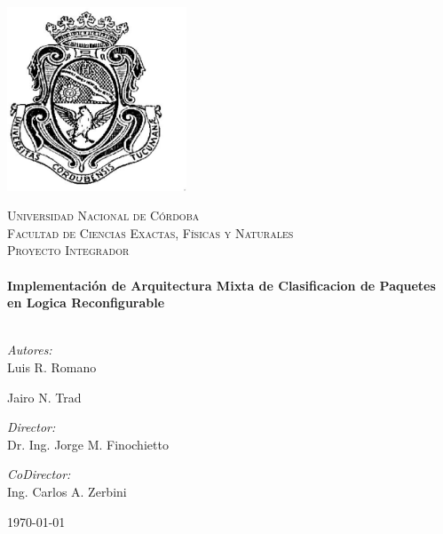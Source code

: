 
\begin{titlepage}
\begin{center}
\includegraphics[width=0.4\textwidth]{Logo-UNC.eps}

\textsc{\LARGE Universidad Nacional de Córdoba}\\[0.5cm]
\textsc{\Large Facultad de Ciencias Exactas, Físicas y Naturales}\\[1cm]
\textsc{\large Proyecto Integrador}\\[0.5cm]

\HRule \\[0.4cm]
{ \huge \bfseries Implementación de Arquitectura Mixta de Clasificacion de Paquetes en Logica Reconfigurable}\\[0.4cm]
\HRule \\[1.5cm]

\begin{minipage}{0.4\textwidth}
\begin{flushleft} \large
\emph{Autores:}\\
Luis R. Romano

Jairo N. Trad
\end{flushleft}
\end{minipage}
\begin{minipage}{0.43\textwidth}
\begin{flushright} \large
\emph{Director:} \\
 Dr. Ing. Jorge M. Finochietto

\emph{CoDirector:} \\
 Ing. Carlos A. Zerbini

\end{flushright}
\end{minipage}

\vfill

{\large \today}

\end{center}

\end{titlepage}
